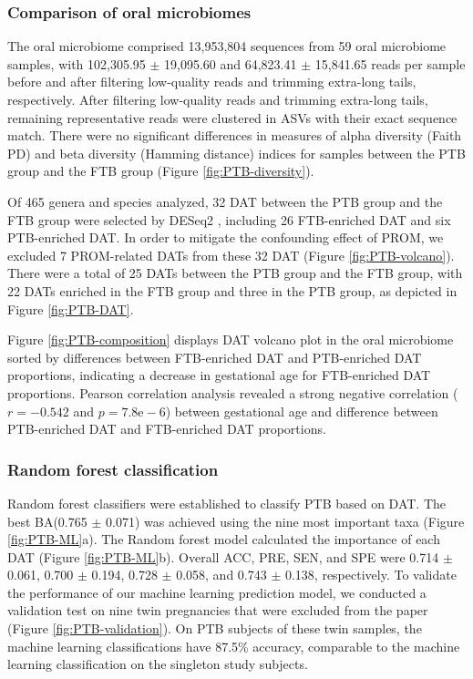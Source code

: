 \documentclass[11pt, a4paper, onecolumn, oneside]{report}
\begin{document}
            \subsubsection{Comparison of oral microbiomes}
                The oral microbiome comprised 13,953,804 sequences from 59 oral microbiome samples, with 102,305.95 $\pm$ 19,095.60 and 64,823.41 $\pm$ 15,841.65 reads per sample before and after filtering low-quality reads and trimming extra-long tails, respectively. After filtering low-quality reads and trimming extra-long tails, remaining representative reads were clustered in ASVs with their exact sequence match. There were no significant differences in measures of alpha diversity (Faith PD) and beta diversity (Hamming distance) indices for samples between the PTB group and the FTB group (Figure \ref{fig:PTB-diversity}).

                Of 465 genera and species analyzed, 32 DAT between the PTB group and the FTB group were selected by DESeq2 \cite{DESeq2-1}, including 26 FTB-enriched DAT and six PTB-enriched DAT. In order to mitigate the confounding effect of PROM, we excluded 7 PROM-related DATs from these 32 DAT (Figure \ref{fig:PTB-volcano}). There were a total of 25 DATs between the PTB group and the FTB group, with 22 DATs enriched in the FTB group and three in the PTB group, as depicted in Figure \ref{fig:PTB-DAT}.

                Figure \ref{fig:PTB-composition} displays DAT volcano plot in the oral microbiome sorted by differences between FTB-enriched DAT and PTB-enriched DAT proportions, indicating a decrease in gestational age for FTB-enriched DAT proportions. Pearson correlation analysis revealed a strong negative correlation ($r = -0.542$ and $p = 7.8\textrm{e}-6$) between gestational age and difference between PTB-enriched DAT and FTB-enriched DAT proportions.

            \subsubsection{Random forest classification}
                Random forest classifiers were established to classify PTB based on DAT. The best BA(0.765 $\pm$ 0.071) was achieved using the nine most important taxa (Figure \ref{fig:PTB-ML}a). The Random forest model calculated the importance of each DAT (Figure \ref{fig:PTB-ML}b). Overall ACC, PRE, SEN, and SPE were 0.714 $\pm$ 0.061, 0.700 $\pm$ 0.194, 0.728 $\pm$ 0.058, and 0.743 $\pm$ 0.138, respectively. To validate the performance of our machine learning prediction model, we conducted a validation test on nine twin pregnancies that were excluded from the paper (Figure \ref{fig:PTB-validation}). On PTB subjects of these twin samples, the machine learning classifications have 87.5\% accuracy, comparable to the machine learning classification on the singleton study subjects.
\end{document}
